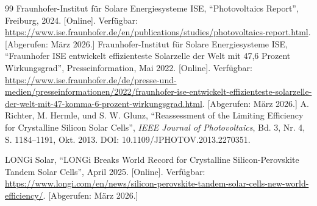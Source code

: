 \documentclass[11pt,a4paper]{article}
\numberwithin{equation}{section}
\begin{document}
\begin{thebibliography}{99}
Fraunhofer-Institut für Solare Energiesysteme ISE, ``Photovoltaics Report'', Freiburg, 2024. [Online]. Verfügbar: \url{https://www.ise.fraunhofer.de/en/publications/studies/photovoltaics-report.html}. [Abgerufen: März 2026.]
Fraunhofer-Institut für Solare Energiesysteme ISE, ``Fraunhofer ISE entwickelt effizienteste Solarzelle der Welt mit 47,6 Prozent Wirkungsgrad'', Presseinformation, Mai 2022. [Online]. Verfügbar: \url{https://www.ise.fraunhofer.de/de/presse-und-medien/presseinformationen/2022/fraunhofer-ise-entwickelt-effizienteste-solarzelle-der-welt-mit-47-komma-6-prozent-wirkungsgrad.html}. [Abgerufen: März 2026.]
A. Richter, M. Hermle, und S. W. Glunz, ``Reassessment of the Limiting Efficiency for Crystalline Silicon Solar Cells'', \emph{IEEE Journal of Photovoltaics}, Bd. 3, Nr. 4, S. 1184--1191, Okt. 2013. DOI: 10.1109/JPHOTOV.2013.2270351.

LONGi Solar, ``LONGi Breaks World Record for Crystalline Silicon-Perovskite Tandem Solar Cells'', April 2025. [Online]. Verfügbar: \url{https://www.longi.com/en/news/silicon-perovskite-tandem-solar-cells-new-world-efficiency/}. [Abgerufen: März 2026.]

\end{thebibliography}





\end{document}
